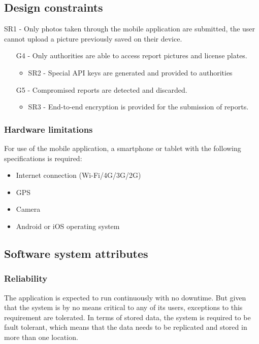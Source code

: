 \subsection{Design constraints}
SR1 - Only photos taken through the mobile application are submitted, the user cannot upload a picture previously saved on their device.
\begin{itemize}
\item
[G4] - Only authorities are able to access report pictures and license plates.
    \begin{itemize}
    \item
    SR2 - Special API keys are generated and provided to authorities
    \end{itemize}
\item
[G5] - Compromised reports are detected and discarded.
    \begin{itemize}
    \item
    SR3 - End-to-end encryption is provided for the submission of reports. 
    \end{itemize}
\end{itemize}
\subsubsection{Hardware limitations}

For use of the mobile application, a smartphone or tablet with the following specifications is required:
\begin{itemize}
   \item 
    Internet connection (Wi-Fi/4G/3G/2G)
   \item 
    GPS
   \item 
    Camera
   \item 
    Android or iOS operating system
\end{itemize}


\subsection{Software system attributes}
\subsubsection{Reliability}
The application is expected to run continuously with no downtime. But given that the system is by no means critical to any of its users, exceptions to this requirement are tolerated. In terms of stored data, the system is required to be fault tolerant, which means that the data needs to be replicated and stored in more than one location.

